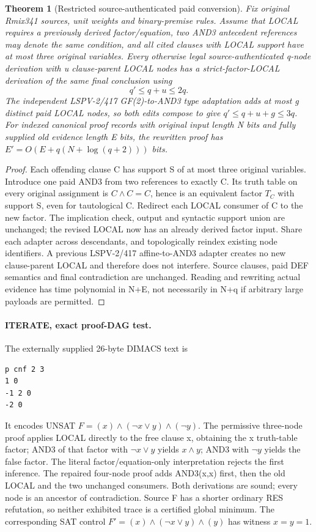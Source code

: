 \documentclass[11pt]{article}
\newtheorem{theorem}{Theorem}
\begin{document}
\begin{theorem}[Restricted source-authenticated paid conversion]
Fix original Rmix341 sources, unit weights and binary-premise rules. Assume that LOCAL requires a previously derived factor/equation, two AND3 antecedent references may denote the same condition, and all cited clauses with LOCAL support have at most three original variables. Every otherwise legal source-authenticated q-node derivation with u clause-parent LOCAL nodes has a strict-factor-LOCAL derivation of the same final conclusion using
\[
q'\le q+u\le2q.
\]
The independent LSPV-2/417 GF(2)-to-AND3 type adaptation adds at most g distinct paid LOCAL nodes, so both edits compose to give \(q'\le q+u+g\le3q\). For indexed canonical proof records with original input length N bits and fully supplied old evidence length E bits, the rewritten proof has \(E'=O(E+q(N+\log(q+2)))\) bits.
\end{theorem}
\begin{proof}
Each offending clause C has support S of at most three original variables. Introduce one paid AND3 from two references to exactly C. Its truth table on every original assignment is \(C\land C=C\), hence is an equivalent factor \(T_C\) with support S, even for tautological C. Redirect each LOCAL consumer of C to the new factor. The implication check, output and syntactic support union are unchanged; the revised LOCAL now has an already derived factor input. Share each adapter across descendants, and topologically reindex existing node identifiers. A previous LSPV-2/417 affine-to-AND3 adapter creates no new clause-parent LOCAL and therefore does not interfere. Source clauses, paid DEF semantics and final contradiction are unchanged. Reading and rewriting actual evidence has time polynomial in N+E, not necessarily in N+q if arbitrary large payloads are permitted.
\end{proof}

\paragraph{ITERATE, exact proof-DAG test.}
The externally supplied 26-byte DIMACS text is
\begin{verbatim}
p cnf 2 3
1 0
-1 2 0
-2 0
\end{verbatim}
It encodes UNSAT \(F=(x)\land(\neg x\lor y)\land(\neg y)\). The permissive three-node proof applies LOCAL directly to the free clause x, obtaining the x truth-table factor; AND3 of that factor with \(\neg x\lor y\) yields \(x\land y\); AND3 with \(\neg y\) yields the false factor. The literal factor/equation-only interpretation rejects the first inference. The repaired four-node proof adds AND3(x,x) first, then the old LOCAL and the two unchanged consumers. Both derivations are sound; every node is an ancestor of contradiction. Source F has a shorter ordinary RES refutation, so neither exhibited trace is a certified global minimum. The corresponding SAT control \(F'=(x)\land(\neg x\lor y)\land(y)\) has witness \(x=y=1\).
\end{document}
